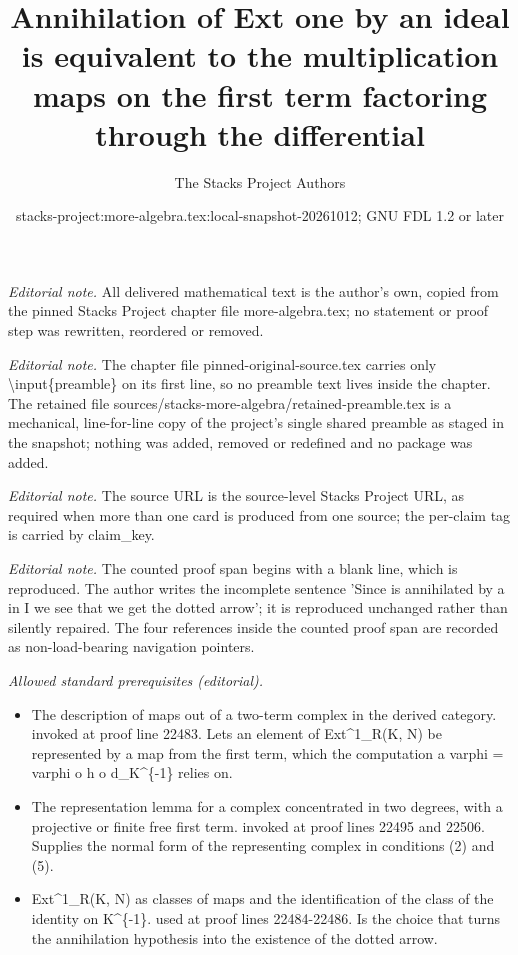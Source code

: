 \documentclass[10pt,a4paper]{amsart}
\title{Annihilation of Ext one by an ideal is equivalent to the multiplication maps on the first term factoring through the differential}
\author{The Stacks Project Authors}
\date{stacks-project:more-algebra.tex:local-snapshot-20261012; GNU FDL 1.2 or later}
\theoremstyle{plain}
\theoremstyle{definition}
\theoremstyle{remark}
\numberwithin{equation}{subsection}
\begin{document}
\maketitle
\setcounter{subsection}{1}
\noindent\textit{Editorial note.} All delivered mathematical text is the author's own, copied from the pinned Stacks Project chapter file more-algebra.tex; no statement or proof step was rewritten, reordered or removed.\par\medskip
\noindent\textit{Editorial note.} The chapter file pinned-original-source.tex carries only \textbackslash{}input\{preamble\} on its first line, so no preamble text lives inside the chapter. The retained file sources/stacks-more-algebra/retained-preamble.tex is a mechanical, line-for-line copy of the project's single shared preamble as staged in the snapshot; nothing was added, removed or redefined and no package was added.\par\medskip
\noindent\textit{Editorial note.} The source URL is the source-level Stacks Project URL, as required when more than one card is produced from one source; the per-claim tag is carried by claim\_key.\par\medskip
\noindent\textit{Editorial note.} The counted proof span begins with a blank line, which is reproduced. The author writes the incomplete sentence 'Since is annihilated by a in I we see that we get the dotted arrow'; it is reproduced unchanged rather than silently repaired. The four references inside the counted proof span are recorded as non-load-bearing navigation pointers.\par\medskip
\noindent\textit{Allowed standard prerequisites (editorial).}\begin{itemize}
\item The description of maps out of a two-term complex in the derived category. invoked at proof line 22483. Lets an element of Ext\textasciicircum{}1\_R(K, N) be represented by a map from the first term, which the computation a varphi = varphi o h o d\_K\textasciicircum{}\{-1\} relies on.
\item The representation lemma for a complex concentrated in two degrees, with a projective or finite free first term. invoked at proof lines 22495 and 22506. Supplies the normal form of the representing complex in conditions (2) and (5).
\item Ext\textasciicircum{}1\_R(K, N) as classes of maps and the identification of the class of the identity on K\textasciicircum{}\{-1\}. used at proof lines 22484-22486. Is the choice that turns the annihilation hypothesis into the existence of the dotted arrow.
\end{itemize}\medskip
\end{document}
